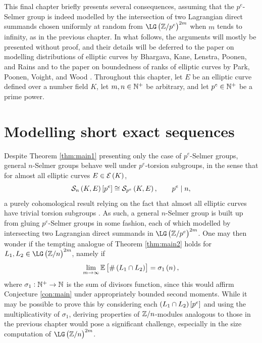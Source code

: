 This final chapter briefly presents several consequences, assuming that the $ p^e $-Selmer group is indeed modelled by the intersection of two Lagrangian direct summands chosen uniformly at random from $ \LG\br{\ZZ / p^e}^{2m} $ when $ m $ tends to infinity, as in the previous chapter. In what follows, the arguments will mostly be presented without proof, and their details will be deferred to the paper on modelling distributions of elliptic curves by Bhargava, Kane, Lenstra, Poonen, and Rains \cite{BKLPR15} and to the paper on boundedness of ranks of elliptic curves by Park, Poonen, Voight, and Wood \cite{PPVW19}. Throughout this chapter, let $ E $ be an elliptic curve defined over a number field $ K $, let $ m, n \in \mathbb{N}^+ $ be arbitrary, and let $ p^e \in \mathbb{N}^+ $ be a prime power.

\section{Modelling short exact sequences}

Despite Theorem \ref{thm:main1} presenting only the case of $ p^e $-Selmer groups, general $ n $-Selmer groups behave well under $ p^e $-torsion subgroups, in the sense that for almost all elliptic curves $ E \in \EEE\br{K} $,
$$ \Sel[n]\sbr{p^e} \cong \Sel[p^e], \qquad p^e \mid n, $$
a purely cohomological result relying on the fact that almost all elliptic curves have trivial torsion subgroups \cite[Proposition 5.9]{BKLPR15}. As such, a general $ n $-Selmer group is built up from gluing $ p^e $-Selmer groups in some fashion, each of which modelled by intersecting two Lagrangian direct summands in $ \LG\br{\ZZ / p^e}^{2m} $. One may then wonder if the tempting analogue of Theorem \ref{thm:main2} holds for $ L_1, L_2 \in \LG\br{\ZZ / n}^{2m} $, namely if
$$ \lim_{m \to \infty} \EE\sbr{\#\br{L_1 \cap L_2}} = \sigma_1\br{n}, $$
where $ \sigma_1 : \mathbb{N}^+ \to \mathbb{N} $ is the sum of divisors function, since this would affirm Conjecture \ref{con:main} under appropriately bounded second moments. While it may be possible to prove this by considering each $ \br{L_1 \cap L_2}\sbr{p^e} $ and using the multiplicativity of $ \sigma_1 $, deriving properties of $ \mathbb{Z} / n $-modules analogous to those in the previous chapter would pose a significant challenge, especially in the size computation of $ \LG\br{\ZZ / n}^{2m} $.

